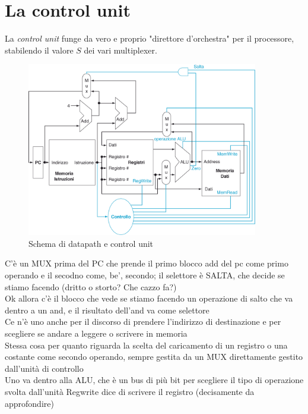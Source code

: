 \documentclass[class=book, crop=false, oneside]{standalone}
\begin{document}
\section{La control unit}
La \emph{control unit} funge da vero e proprio "direttore d'orchestra" per il processore, stabilendo il valore \(S\) dei vari multiplexer.
\begin{figure}[H]
	\centering
	\includegraphics[width=0.9\textwidth,keepaspectratio]{datap_2}
	\caption{Schema di datapath e control unit}
\end{figure}
C’è un MUX prima del PC che prende il primo blocco add del pc come primo operando e il secodno come, be’, secondo; il selettore è SALTA, che decide se stiamo facendo (dritto o storto? Che cazzo fa?)\\

Ok allora c’è il blocco che vede se stiamo facendo un operazione di salto che va dentro a un and, e il risultato dell’and va come selettore\\

Ce n’è uno anche per il discorso di prendere l’indirizzo di destinazione e per scegliere se andare a leggere o scrivere in memoria\\

Stessa cosa per quanto riguarda la scelta del caricamento di un registro o una costante come secondo operando, sempre gestita da un MUX direttamente gestito dall’unità di controllo\\

Uno va dentro alla ALU, che è un bus di più bit per scegliere il tipo di operazione svolta dall’unità
Regwrite dice di scrivere il registro (decisamente da approfondire)\\
\end{document}
